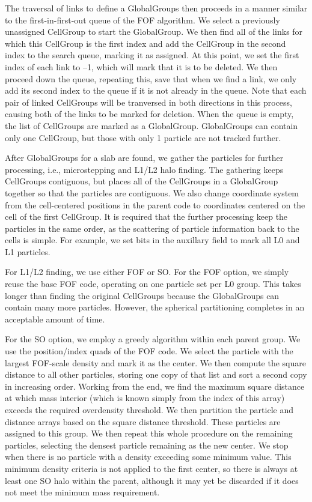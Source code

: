 The traversal of links to define a GlobalGroups then proceeds in a 
manner similar to the first-in-first-out queue of the FOF algorithm.
We select a previously unassigned CellGroup to start the GlobalGroup.
We then find all of the links for which this CellGroup is the first 
index and add the CellGroup in the second index to the search queue,
marking it as assigned.  At this point, we set the first index of 
each link to --1, which will mark that it is to be deleted.
We then proceed down the queue, repeating this, save that when we
find a link, we only add its second index to the queue if it is not
already in the queue.  Note that each pair of linked CellGroups
will be tranversed in both directions in this process, causing both
of the links to be marked for deletion.  When the queue is empty,
the list of CellGroups are marked as a GlobalGroup.  GlobalGroups
can contain only one CellGroup, but those with only 1 particle
are not tracked further.

After GlobalGroups for a slab are found, we gather the particles for
further processing, i.e., microstepping and L1/L2 halo finding.  The
gathering keeps CellGroups contiguous, but places all of the CellGroups
in a GlobalGroup together so that the particles are contiguous.  We also
change coordinate system from the cell-centered positions in the parent
code to coordinates centered on the cell of the first CellGroup.  It
is required that the further processing keep the particles in the
same order, as the scattering of particle information back to the
cells is simple.  For example, we set bits in the auxillary field 
to mark all L0 and L1 particles.


For L1/L2 finding, we use either FOF or SO.  For the FOF option,
we simply reuse the base FOF code, operating on one particle set
per L0 group.  This takes longer than finding the original CellGroups
because the GlobalGroups can contain many more particles.  However,
the spherical partitioning completes in an acceptable amount of
time.

For the SO option, we employ a greedy algorithm within each parent
group.  We use the position/index quads of the FOF code.  We select
the particle with the largest FOF-scale density and mark it as the
center.  We then compute the square distance to all other particles,
storing one copy of that list and sort a second copy in increasing
order.  Working from the end, we find the maximum square distance
at which mass interior (which is known simply from the index of
this array) exceeds the required overdensity threshold.  We then
partition the particle and distance arrays based on the square
distance threshold.  These particles are assigned to this group.
We then repeat this whole procedure on the remaining particles,
selecting the densest particle remaining as the new center.  We stop
when there is no particle with a density exceeding some minimum
value.  This minimum density criteria is not applied to the first
center, so there is always at least one SO halo within the parent,
although it may yet be discarded if it does not meet the minimum
mass requirement.

